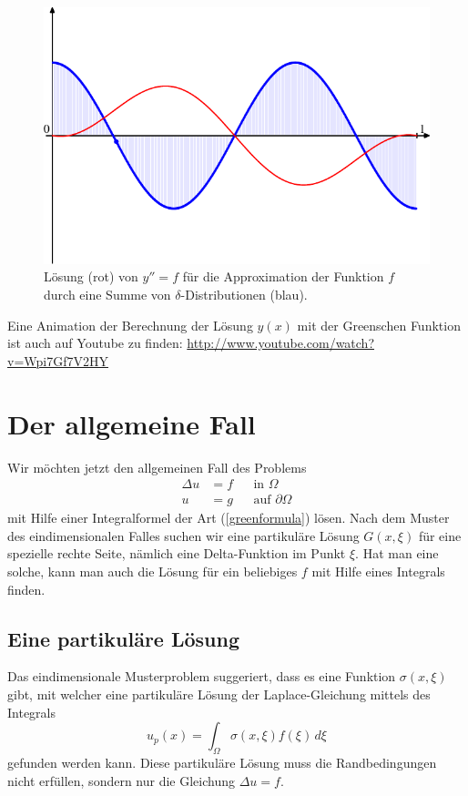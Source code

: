 \begin{beispiel}
\begin{figure}
\begin{center}
\includegraphics[width=0.7\hsize]{graphics/green-1082.pdf}
\end{center}
\caption{Lösung (rot) von $y''=f$ für die Approximation der Funktion $f$
durch eine Summe von $\delta$-Distributionen (blau).
\label{elliptisch:green-beispiele}}
\end{figure}

Eine Animation der Berechnung der Lösung $y(x)$ mit der Greenschen
Funktion ist auch auf Youtube zu finden: \url{http://www.youtube.com/watch?v=Wpi7Gf7V2HY}
\end{beispiel}

\section{Der allgemeine Fall}
Wir möchten jetzt den allgemeinen Fall des Problems
\begin{align*}
\Delta u&=f&&\text{in $\Omega$}\\
u&=g&&\text{auf $\partial\Omega$}
\end{align*}
mit Hilfe einer Integralformel der Art (\ref{greenformula}) 
lösen. Nach dem Muster des eindimensionalen Falles suchen
wir eine partikuläre Lösung $G(x,\xi)$ für eine spezielle rechte Seite,
nämlich eine Delta-Funktion im Punkt $\xi$.  Hat man eine
solche, kann man auch die Lösung für ein beliebiges $f$ mit
Hilfe eines Integrals finden.


\subsection{Eine partikuläre Lösung}
Das eindimensionale Musterproblem suggeriert, dass es eine
Funktion $\sigma(x,\xi)$ gibt, mit welcher eine partikuläre Lösung
der Laplace-Gleichung mittels des Integrals
\begin{equation}
u_p(x)=\int_\Omega \sigma(x,\xi)  f(\xi)\,d\xi
\label{singulaereloesunglaplace}
\end{equation}
gefunden werden kann.
Diese partikuläre Lösung muss die Randbedingungen nicht erfüllen,
sondern nur die Gleichung $\Delta u=f$.

